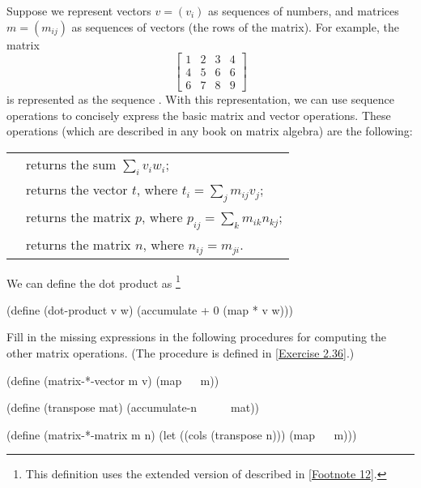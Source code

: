 \begin{exercise}
	\label{Exercise 2.37}
	Suppose we represent vectors \( v = (v_i) \) as sequences of numbers, and matrices \( m = (m_{ij}) \) as sequences of vectors (the rows of the matrix).
	For example, the matrix
	\[
	\begin{bmatrix}
		1 & 2 & 3 & 4 \\
		4 & 5 & 6 & 6 \\
		6 & 7 & 8 & 9
	\end{bmatrix}
	\]
	is represented as the sequence .
	With this representation, we can use sequence operations to concisely express the basic matrix and vector operations.
	These operations (which are described in any book on matrix algebra) are the following:
	\begin{center}
		\begingroup
		\renewcommand{\arraystretch}{1.5}
		\begin{tabular}{ll}
			\code{(dot-product v w)}
			&
			returns the sum \( ∑_i v_i w_i \);
			\\
			\code{(matrix-*-vector m v)}
			&
			\makecell{
				returns the vector \( t \), \\
				where \( t_i = ∑_j m_{ij} v_j \);
			}
			\\
			\code{(matrix-*-matrix m n)}
			&
			\makecell{
				returns the matrix \( p \), \\
				where \( p_{ij} = ∑_k m_{ik} n_{kj} \);
			}
			\\
			\code{(transpose m)}
			&
			\makecell{
				returns the matrix \( n \), \\
				where \( n_{ij} = m_{ji} \).
			}
		\end{tabular}
		\endgroup
	\end{center}
	We can define the dot product as%
	\footnote{
		This definition uses the extended version of  described in \cref{Footnote 12}.
	}
	\begin{scheme}
	  (define (dot-product v w)
	    (accumulate + 0 (map * v w)))
	\end{scheme}
	Fill in the missing expressions in the following procedures for computing the other matrix operations.
	(The procedure  is defined in \cref{Exercise 2.36}.)
	\begin{scheme}
	  (define (matrix-*-vector m v)
	    (map ~~ m))

	  (define (transpose mat)
	    (accumulate-n ~~ ~~ mat))

	  (define (matrix-*-matrix m n)
	    (let ((cols (transpose n)))
	      (map ~~ m)))
	\end{scheme}
\end{exercise}



